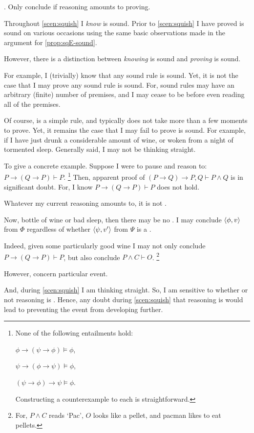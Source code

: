 \begin{note}
  .
  Only conclude if reasoning amounts to proving.

  Throughout \autoref{scen:squish} I \emph{know} \sqE{} is sound.
  Prior to \autoref{scen:squish} I have proved \sqE{} is sound on various occasions using the same basic observations made in the argument for \autoref{prop:sqE-sound}.

  However, there is a distinction between \emph{knowing} \sqE{} is sound and \emph{proving} \sqE{} is sound.

  For example, I (trivially) know that any sound rule is sound.
  Yet, it is not the case that I may prove any sound rule is sound.
  For, sound rules may have an arbitrary (finite) number of premises, and I may cease to be before even reading all of the premises.

  Of course, \sqE{} is a simple rule, and typically does not take more than a few moments to prove.
  Yet, it remains the case that I may fail to prove \sqE{} is sound.
  For example, if I have just drunk a considerable amount of wine, or woken from a night of tormented sleep.
  Generally said, I may not be thinking straight.

  To give a concrete example.
  Suppose I were to pause and reason to:
  \(P \rightarrow (Q \rightarrow P) \vdash P\).%
  \footnote{
    None of the following entailments hold:
    \begin{enumerate*}[noitemsep, label=]
    \item
      \(\phi \rightarrow (\psi \rightarrow \phi) \vDash \phi\),
    \item
      \(\psi \rightarrow (\phi \rightarrow \psi) \vDash \phi\),
    \item
      \((\psi \rightarrow \phi) \rightarrow \psi \vDash \phi\).
    \end{enumerate*}
    Constructing a counterexample to each is straightforward.
  }
  Then, apparent proof of \((P \rightarrow Q) \rightarrow P, Q \vdash P \land Q\) is in significant doubt.
  For, I know \(P \rightarrow (Q \rightarrow P) \vdash P\) does not hold.

  Whatever my current reasoning amounts to, it is not \sR{}.
\end{note}

\begin{note}
  Now, bottle of wine or bad sleep, then there may be no .
  I may conclude \(\langle \phi, v \rangle\) from \(\Phi\) regardless of whether \(\langle \psi, v' \rangle\) from \(\Psi\) is a \fc{}.

  Indeed, given some particularly good wine I may not only conclude \(P \rightarrow (Q \rightarrow P) \vdash P\), but also conclude \(P \land C \vdash O\).%
  \footnote{
    For, \(P \land C\) reads `Pac', \(O\) looks like a pellet, and pacman likes to eat pellets.
  }

  However,  concern particular event.

  And, during \autoref{scen:squish} I am thinking straight.
  So, I am sensitive to whether or not reasoning is .
  Hence, any doubt during \autoref{scen:squish} that reasoning is  would lead to preventing the event from developing further.
\end{note}

